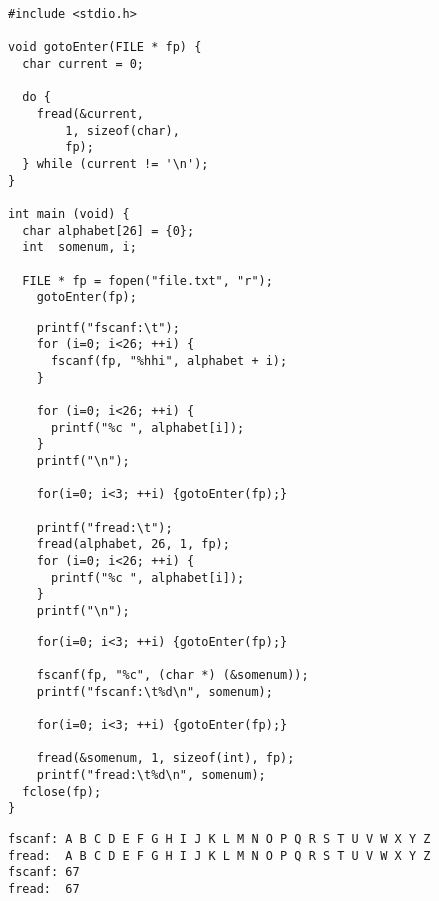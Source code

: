 
\begin{frame}[fragile]
%
%
\begin{codebox}
\begin{verbatim}
#include <stdio.h>

void gotoEnter(FILE * fp) {
  char current = 0;
  
  do {
    fread(&current, 
        1, sizeof(char), 
        fp);
  } while (current != '\n');
}

int main (void) {
  char alphabet[26] = {0};
  int  somenum, i;
  
  FILE * fp = fopen("file.txt", "r");
    gotoEnter(fp);
\end{verbatim}
\end{codebox}
%
\begin{codebox}[... Fortsetzung ...]
\begin{verbatim}
    printf("fscanf:\t");
    for (i=0; i<26; ++i) {
      fscanf(fp, "%hhi", alphabet + i);
    }
    
    for (i=0; i<26; ++i) {
      printf("%c ", alphabet[i]);
    }
    printf("\n");
    
    for(i=0; i<3; ++i) {gotoEnter(fp);}
    
    printf("fread:\t");
    fread(alphabet, 26, 1, fp);
    for (i=0; i<26; ++i) {
      printf("%c ", alphabet[i]);
    }
    printf("\n");
\end{verbatim}
\end{codebox}
%
\end{frame}


\begin{frame}[fragile]
%
\begin{codebox}[... Fortsetzung]
\begin{verbatim}
    for(i=0; i<3; ++i) {gotoEnter(fp);}
    
    fscanf(fp, "%c", (char *) (&somenum));
    printf("fscanf:\t%d\n", somenum);
    
    for(i=0; i<3; ++i) {gotoEnter(fp);}
    
    fread(&somenum, 1, sizeof(int), fp);
    printf("fread:\t%d\n", somenum);
  fclose(fp);
}
\end{verbatim}
\end{codebox}
%
\begin{cmdbox}[Ausgabe]
\begin{verbatim}
fscanf: A B C D E F G H I J K L M N O P Q R S T U V W X Y Z 
fread:  A B C D E F G H I J K L M N O P Q R S T U V W X Y Z 
fscanf: 67
fread:  67
\end{verbatim}
\end{cmdbox}
%
\end{frame}

